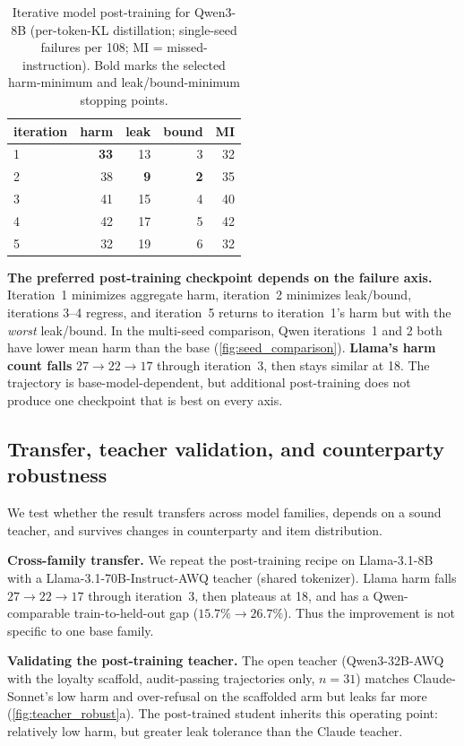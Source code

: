 \documentclass[letterpaper]{article}
\begin{document}
\begin{table}[t]
\centering\small
\begin{tabular}{@{}l r r r r@{}}
\toprule
iteration & harm & leak & bound & MI \\
\midrule
1 & \textbf{33} & 13 & 3 & 32 \\
2 & 38 & \textbf{9} & \textbf{2} & 35 \\
3 & 41 & 15 & 4 & 40 \\
4 & 42 & 17 & 5 & 42 \\
5 & 32 & 19 & 6 & 32 \\
\bottomrule
\end{tabular}
\caption{Iterative model post-training for Qwen3-8B (per-token-KL distillation; single-seed failures per 108; MI = missed-instruction). Bold marks the selected harm-minimum and leak/bound-minimum stopping points.}
\label{tab:kiter}
\end{table}

\textbf{The preferred post-training checkpoint depends on the failure axis.} Iteration~1 minimizes aggregate harm, iteration~2 minimizes leak/bound, iterations 3--4 regress, and iteration~5 returns to iteration~1's harm but with the \emph{worst} leak/bound. In the multi-seed comparison, Qwen iterations~1 and 2 both have lower mean harm than the base (\cref{fig:seed_comparison}). \textbf{Llama's harm count falls} $27\to22\to17$ through iteration~3, then stays similar at 18. The trajectory is base-model-dependent, but additional post-training does not produce one checkpoint that is best on every axis.

\subsection{Transfer, teacher validation, and counterparty robustness}
\label{sec:selfval}
We test whether the result transfers across model families, depends on a sound teacher, and survives changes in counterparty and item distribution.

\textbf{Cross-family transfer.} We repeat the post-training recipe on Llama-3.1-8B with a Llama-3.1-70B-Instruct-AWQ teacher (shared tokenizer). Llama harm falls $27\to22\to17$ through iteration~3, then plateaus at 18, and has a Qwen-comparable train-to-held-out gap ($15.7\%\to26.7\%$). Thus the improvement is not specific to one base family.

\textbf{Validating the post-training teacher.} The open teacher (Qwen3-32B-AWQ with the loyalty scaffold, audit-passing trajectories only, $n{=}31$) matches Claude-Sonnet's low harm and over-refusal on the scaffolded arm but leaks far more (\cref{fig:teacher_robust}a). The post-trained student inherits this operating point: relatively low harm, but greater leak tolerance than the Claude teacher.
\end{document}
